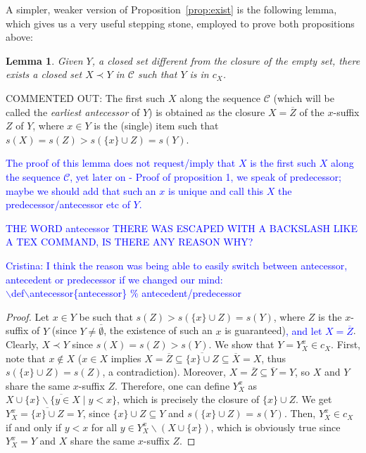\documentclass{article}
\newtheorem{lemma}{Lemma}
\newcommand{\added}[1]{\textcolor{blue}{#1}}
\newcommand{\st}[1]{%
  \sbox0{#1}%
  \usebox0%
  \llap{\rule[0.5ex]{\wd0}{0.4pt}}%
}
\def\C{\mathcal{C}}
\def\s{\mathit{s}}
\newcommand{\cl}[1]{\overline{#1}}
\def\bef{\prec}
\begin{document}
A simpler, weaker version of Proposition~\ref{prop:exist} is
the following lemma, which gives us a very useful stepping 
stone, employed to prove both propositions above:

\begin{lemma}\label{lem:earlantec}
Given $Y$, a closed set different from 
the closure of the empty set, there exists 
a closed set $X \bef Y$ in $\C$ such that 
$Y$ is in $c_X$.
\end{lemma}

COMMENTED OUT:
The first such $X$ along the
sequence $\C$ (which will be called the 
\emph{earliest antecessor} of $Y$) is 
obtained as the closure $X=\cl{Z}$ of 
the $x$-suffix $Z$ of $Y$, where $x\in Y$ is
the (single) item such that 
$s(X) = s(Z) > s(\{x\}\cup Z) = s(Y)$.

\added{The proof of this lemma does not request/imply that $X$ is the first such $X$ along the sequence $\C$, yet later on - Proof of proposition 1, we speak of predecessor; maybe we should add that such an $x$ is unique and call this $X$ the predecessor/antecessor etc of $Y$.}

\added{THE WORD antecessor THERE WAS ESCAPED WITH A BACKSLASH
LIKE A TEX COMMAND, IS THERE ANY REASON WHY?}

\added{Cristina: I think the reason was being able to easily switch between antecessor, antecedent or predecessor if we changed our mind:\\
$\backslash$def$\backslash$antecessor\{antecessor\} $\%$ antecedent/predecessor}



\begin{proof} %
Let $x \in Y$ be such that $\s(Z) > \s(\{x\} \cup Z)=\s(Y)$, where $Z$ is the $x$-suffix of $Y$\st{, and $X=\cl{Z}$} (since $Y \neq \cl{\emptyset}$, the existence of such an $x$ is guaranteed)\added{, and let $X = \cl{Z}$}. Clearly, $X \bef Y$ since $\s(X)=\s(Z)>\s(Y)$. We show that $Y=Y^x_X \in c_X$.
First, note that $x \notin X$ ($x \in X$ implies $X=\cl{Z} \subseteq \cl{\{x\} \cup Z} \subseteq \cl{X} = X$, thus $\s(\{x\} \cup Z)=\s(Z)$, a contradiction).
Moreover,  $X=\cl{Z} \subseteq \cl{Y}=Y$, so $X$ and $Y$ share the same $x$-suffix $Z$. 
Therefore, one can define $Y^{x}_{X}$ as $\cl{X \cup \{x\} \backslash \{y \in X \mid y < x\}}$, which is precisely the closure of $\{x\} \cup Z$. We get $Y^x_X=\cl{\{x\} \cup Z}=Y$, since $\{x\} \cup Z \subseteq Y$ and $\s(\{x\} \cup Z)$ = $\s(Y)$.
Then, $Y^{x}_{X} \in c_{X}$ if and only if $y < x$ for all $y \in Y^{x}_{X} \backslash (X \cup \{x\})$, which is obviously true since $Y^{x}_{X}=Y$ and $X$ share the same $x$-suffix $Z$.
\end{proof}
\end{document}
